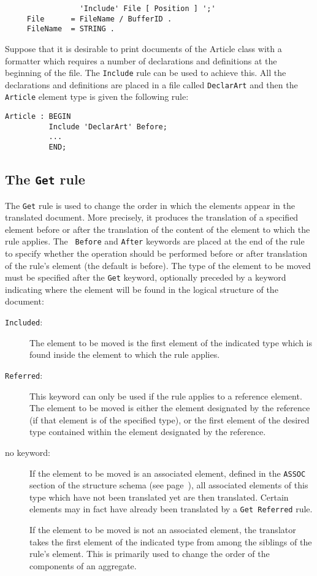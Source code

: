 \begin{verbatim}
                 'Include' File [ Position ] ';'
     File      = FileName / BufferID .
     FileName  = STRING .
\end{verbatim}

\begin{example}
Suppose that it is desirable to print documents of the Article class
with a formatter which requires a number of declarations and
definitions at the beginning of the file.  The {\tt Include} rule can
be used to achieve this.  All the declarations and definitions are
placed in a file called {\tt DeclarArt} and then the {\tt Article}
element type is given the following rule:
\begin{verbatim}
Article : BEGIN
          Include 'DeclarArt' Before;
          ...
          END;
\end{verbatim}
\end{example}

\subsection{The {\tt Get} rule}

The {\tt Get} rule is used to change the order in which the elements
appear in the translated document.  More precisely, it produces  the
translation of a specified element before or after the translation of
the content of the element to which the rule applies.  The {\tt
Before} and {\tt After} keywords are placed at the end of the rule to
specify whether the operation should be performed before or after
translation of the rule's element (the default is before). The type of
the element to be moved must be specified after the {\tt Get} keyword,
optionally preceded by a keyword indicating where the element will be
found in the logical structure of the document:
\begin{description}
\item[ {\tt Included}: ]
The element to be moved is the first element of the indicated type
which is found inside the element to which the rule applies.

\item[ {\tt Referred}: ]
This keyword can only be used if the rule applies to a reference
element.  The element to be moved is either the element designated by
the reference (if that element is of the specified type), or the first
element of the desired type contained within the element designated by
the reference.
\item[ no keyword: ]
If the element to be moved is an associated element, defined in the
{\tt ASSOC} section of the structure schema (see
page~\pageref{elemassoc}), all associated elements of this type which
have not been translated yet are then translated.  Certain elements
may in fact have already been translated by a {\tt Get Referred} rule.

If the element to be moved is not an associated element, the
translator takes the first element of the indicated type from among
the siblings of the rule's element.  This is primarily used to change
the order of the components of an aggregate.
\end{description}

